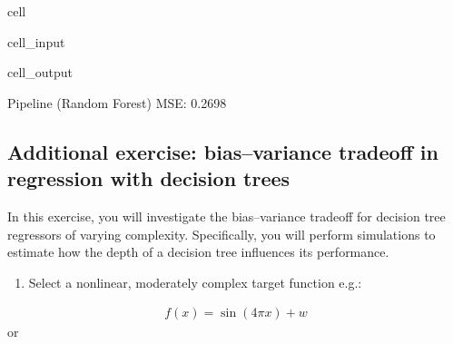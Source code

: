 \documentclass[letterpaper,10pt,english]{jupyterBook}
\begin{document}
\begin{sphinxuseclass}{cell}
\begin{sphinxVerbatimInput}
\begin{sphinxuseclass}{cell_input}
\end{sphinxuseclass}\end{sphinxVerbatimInput}
\begin{sphinxVerbatimOutput}

\begin{sphinxuseclass}{cell_output}
\begin{sphinxVerbatim}[commandchars=\\\{\}]
Pipeline (Random Forest) MSE: 0.2698
\end{sphinxVerbatim}

\end{sphinxuseclass}\end{sphinxVerbatimOutput}

\end{sphinxuseclass}

\subsection{Additional exercise: bias–variance trade\sphinxhyphen{}off in regression with decision trees}
\label{\detokenize{03:additional-exercise-biasvariance-trade-off-in-regression-with-decision-trees}}
\sphinxAtStartPar
In this exercise, you will investigate the bias–variance trade\sphinxhyphen{}off for decision tree regressors of varying complexity. Specifically, you will perform simulations to estimate how the depth of a decision tree influences its performance.
\begin{enumerate}
%
\item {} 
\sphinxAtStartPar
Select a nonlinear, moderately complex target function e.g.:

\end{enumerate}
\begin{equation*}
\begin{split}f(x) = \sin(4\pi x) + w\end{split}
\end{equation*}
\sphinxAtStartPar
or
\end{document}
